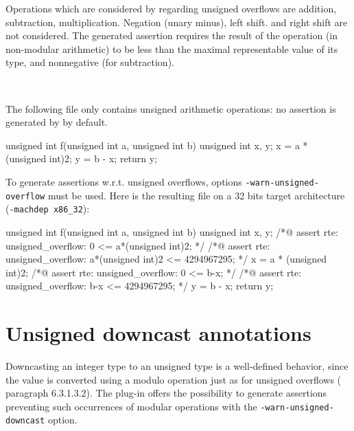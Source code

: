 Operations which are considered by \rte{} regarding unsigned overflows are
addition, subtraction, multiplication. Negation (unary minus), left shift.
and right shift are not considered. The generated assertion requires the result
of the operation (in non-modular arithmetic) to be less than the maximal
representable value of its type, and nonnegative (for subtraction).

\begin{example} ~

The following file only contains unsigned arithmetic operations: no assertion is
generated by \rte{} by default.
\begin{listing-nonumber}
unsigned int f(unsigned int a, unsigned int b) {
  unsigned int x, y;
  x = a * (unsigned int)2;
  y = b - x;
  return y;
}
\end{listing-nonumber}

To generate assertions w.r.t. unsigned overflows, options
\lstinline|-warn-unsigned-overflow| must be used. Here is the resulting
file on a 32 bits target architecture (\lstinline|-machdep x86_32|):
\begin{listing-nonumber}
unsigned int f(unsigned int a, unsigned int b) {
  unsigned int x, y;
  /*@ assert rte: unsigned_overflow: 0 <= a*(unsigned int)2; */
  /*@ assert rte: unsigned_overflow: a*(unsigned int)2 <= 4294967295; */
  x = a * (unsigned int)2;
  /*@ assert rte: unsigned_overflow: 0 <= b-x; */
  /*@ assert rte: unsigned_overflow: b-x <= 4294967295; */
  y = b - x;
  return y;
}


\end{listing-nonumber}
\end{example}

\section{Unsigned downcast annotations}

Downcasting an integer type to an unsigned type is a well-defined behavior,
since the value is converted using a modulo operation just as for unsigned
overflows (\cnn{} paragraph {6.3.1.3.2}). The \rte{} plug-in offers the
possibility to generate assertions preventing such occurrences of modular
operations with the \lstinline|-warn-unsigned-downcast| option.

